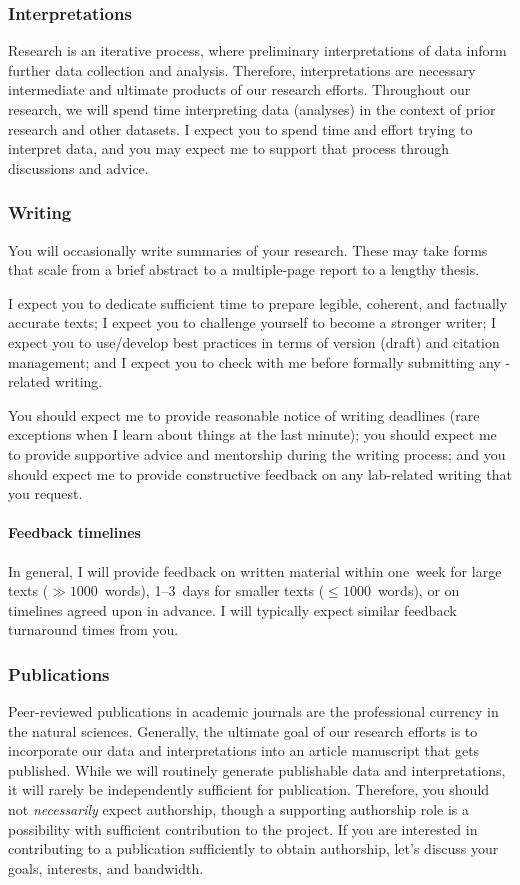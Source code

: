 \subsubsection{Interpretations}
Research is an iterative process, where preliminary interpretations of data inform further data collection and analysis. 
Therefore, interpretations are necessary intermediate and ultimate products of our research efforts.
Throughout our research, we will spend time interpreting data (analyses) in the context of prior research and other datasets. 
I expect you to spend time and effort trying to interpret data, and you may expect me to support that process through discussions and advice.


\subsubsection{Writing}
You will occasionally write summaries of your research.
These may take forms that scale from a brief abstract to a multiple-page report to a lengthy thesis. 

I expect you to dedicate sufficient time to prepare legible, coherent, and factually accurate texts;
I expect you to challenge yourself to become a stronger writer; 
I expect you to use/develop best practices in terms of version (draft) and citation management; and 
I expect you to check with me before formally submitting any \grackle-related writing. 

You should expect me to provide reasonable notice of writing deadlines (rare exceptions when I learn about things at the last minute); 
you should expect me to provide supportive advice and mentorship during the writing process; and
you should expect me to provide constructive feedback on any lab-related writing that you request.

\paragraph{Feedback timelines} 
In general, I will provide feedback on written material within one~week for large texts ($\gg1000$~words), 1--3~days for smaller texts ($\le 1000$~words), or on timelines agreed upon in advance.
I will typically expect similar feedback turnaround times from you.
 

\subsubsection{Publications}
Peer-reviewed publications in academic journals are the professional currency in the natural sciences.  
Generally, the ultimate goal of our research efforts is to incorporate our data and interpretations into an article manuscript that gets published.
While we will routinely generate publishable data and interpretations, it will rarely be independently sufficient for publication.
Therefore, you should not \emph{necessarily} expect authorship, though a supporting authorship role is a possibility with sufficient contribution to the project. 
If you are interested in contributing to a publication sufficiently to obtain authorship, let's discuss your goals, interests, and bandwidth.

